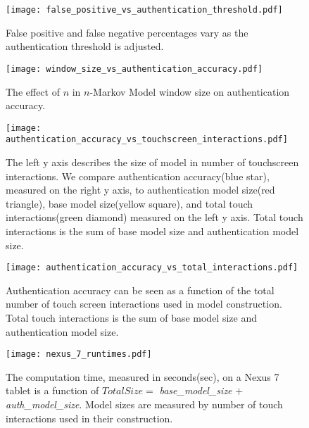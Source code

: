 \begin{figure}
\centering
\texttt{[image: false\_positive\_vs\_authentication\_threshold.pdf]}
\caption{False positive and false negative percentages vary as the authentication threshold is adjusted.}
\label{fig:threshold_vs_percentages}
\end{figure}

\begin{figure}
\centering
\texttt{[image: window\_size\_vs\_authentication\_accuracy.pdf]}
\caption{The effect of $n$ in $n$-Markov Model window size on authentication accuracy.}
\label{fig:window_size_vs_authentication_accuracy}
\end{figure}

\begin{figure}
\centering
\texttt{[image: authentication\_accuracy\_vs\_touchscreen\_interactions.pdf]}
\caption{
The left y axis describes the size of model
in number of touchscreen interactions.
We compare
authentication accuracy(blue star), measured on the right y axis, 
to authentication model size(red triangle),
base model size(yellow square),
and total touch interactions(green diamond)
measured on the left y axis.
Total touch interactions is the sum of
base model size and authentication model size.
}
\label{fig:authentication_accuracy}
\end{figure}

\begin{figure}
\centering
\texttt{[image: authentication\_accuracy\_vs\_total\_interactions.pdf]}
\caption{
Authentication accuracy can be seen as
a function of
the total number of touch screen interactions
used in model construction.
Total touch interactions is the sum of
base model size and authentication model size.
}
\label{fig:total_touches_vs_authentication_accuracy}
\end{figure}

\begin{figure}
\centering
\texttt{[image: nexus\_7\_runtimes.pdf]}
\caption{
The computation time, measured in seconds(sec), on a Nexus 7 tablet is
a function of
$Total Size =$ {\it base\_model\_size} $+$ {\it auth\_model\_size}.
Model sizes are measured by number of touch interactions used in their construction.
}
\label{fig:nexus_total_size_time}
\end{figure}

